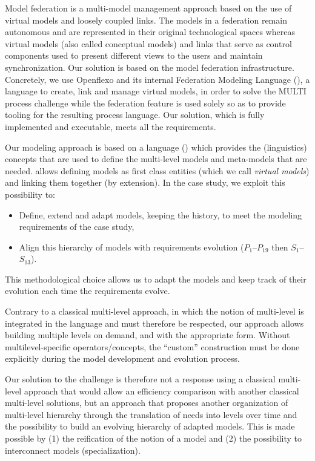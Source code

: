 Model federation is a multi-model management approach based on the use of virtual models and loosely coupled links. The models in a federation remain autonomous and are represented in their original technological spaces whereas virtual models (also called conceptual models) and links that serve as control components used to present different views to the users and maintain synchronization.
Our solution is based on the model federation infrastructure. Concretely, we use Openflexo and its internal Federation Modeling Language (\FML), a language to create, link and manage virtual models, in order to solve the MULTI process challenge while the federation feature is used solely so as to provide tooling for the resulting process language. Our solution, which is fully implemented and executable, meets all the requirements.

Our modeling approach is based on a language (\FML) which provides the (linguistics) concepts that are used to define the multi-level models and meta-models that are needed. \FML allows defining models as first class entities (which we call \emph{virtual models}) and linking them together (by extension). In the \mpc case study, we exploit this possibility to:
\begin{itemize}
    \item Define, extend and adapt models, keeping the history, to meet the %
    modeling requirements of the case study,
    \item Align this hierarchy of models with requirements evolution
      ($P_1$--$P_{19}$ then $S_1$--$S_{13}$).
\end{itemize}
This methodological choice allows us to adapt the models and keep track of their evolution each time the requirements evolve.

Contrary to a classical multi-level approach, in which the notion of
multi-level is integrated in the language and must therefore be respected, our
approach allows building multiple levels on demand, and with the appropriate form.
Without multilevel-specific operators/concepts, the \enquote{custom}
construction must be done explicitly during the model development and evolution
process.

Our solution to the challenge is therefore not a response using a classical multi-level approach that would allow an efficiency comparison with another classical multi-level solutions, but an approach that proposes another organization of multi-level hierarchy through the translation of needs into levels over time and the possibility to build an evolving hierarchy of adapted models. This is made possible by (1) the reification of the notion of a model and (2) the possibility to interconnect models (specialization).%

